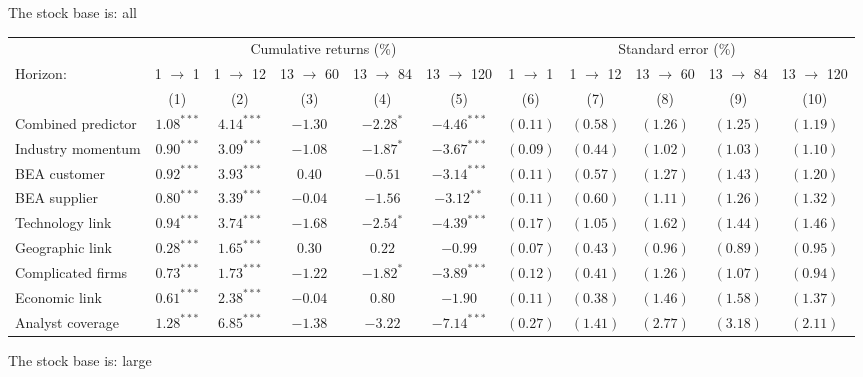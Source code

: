 \documentclass[
]{article}
\author{}
\date{\vspace{-2.5em}}
\begin{document}
The stock base is: all

\begin{tabular}{lcccccccccc}
   \toprule & \multicolumn{5}{c}{Cumulative returns (\%)} & \multicolumn{5}{c}{Standard error (\%)} \\
 \cmidrule(l){2-6} \cmidrule(l){7-11}Horizon: & 1 $\rightarrow$ 1 & 1 $\rightarrow$ 12 & 13 $\rightarrow$ 60 & 13 $\rightarrow$ 84 & 13 $\rightarrow$ 120 & 1 $\rightarrow$ 1 & 1 $\rightarrow$ 12 & 13 $\rightarrow$ 60 & 13 $\rightarrow$ 84 & 13 $\rightarrow$ 120 \\ 
   \cmidrule(l){2-6} \cmidrule(l){7-11} \vspace{5pt} & (1) & (2) & (3) & (4) & (5) & (6) & (7) & (8) & (9) & (10) \\ 
   \vspace{5pt}Combined predictor & $1.08^{***}$ & $4.14^{***}$ & $-1.30$ & $-2.28^{*}$ & $-4.46^{***}$ & $(0.11)$ & $(0.58)$ & $(1.26)$ & $(1.25)$ & $(1.19)$ \\ 
  Industry momentum & $0.90^{***}$ & $3.09^{***}$ & $-1.08$ & $-1.87^{*}$ & $-3.67^{***}$ & $(0.09)$ & $(0.44)$ & $(1.02)$ & $(1.03)$ & $(1.10)$ \\ 
  BEA customer & $0.92^{***}$ & $3.93^{***}$ & $0.40$ & $-0.51$ & $-3.14^{***}$ & $(0.11)$ & $(0.57)$ & $(1.27)$ & $(1.43)$ & $(1.20)$ \\ 
  BEA supplier & $0.80^{***}$ & $3.39^{***}$ & $-0.04$ & $-1.56$ & $-3.12^{**}$ & $(0.11)$ & $(0.60)$ & $(1.11)$ & $(1.26)$ & $(1.32)$ \\ 
  Technology link & $0.94^{***}$ & $3.74^{***}$ & $-1.68$ & $-2.54^{*}$ & $-4.39^{***}$ & $(0.17)$ & $(1.05)$ & $(1.62)$ & $(1.44)$ & $(1.46)$ \\ 
  Geographic link & $0.28^{***}$ & $1.65^{***}$ & $0.30$ & $0.22$ & $-0.99$ & $(0.07)$ & $(0.43)$ & $(0.96)$ & $(0.89)$ & $(0.95)$ \\ 
  Complicated firms & $0.73^{***}$ & $1.73^{***}$ & $-1.22$ & $-1.82^{*}$ & $-3.89^{***}$ & $(0.12)$ & $(0.41)$ & $(1.26)$ & $(1.07)$ & $(0.94)$ \\ 
  Economic link & $0.61^{***}$ & $2.38^{***}$ & $-0.04$ & $0.80$ & $-1.90$ & $(0.11)$ & $(0.38)$ & $(1.46)$ & $(1.58)$ & $(1.37)$ \\ 
  Analyst coverage & $1.28^{***}$ & $6.85^{***}$ & $-1.38$ & $-3.22$ & $-7.14^{***}$ & $(0.27)$ & $(1.41)$ & $(2.77)$ & $(3.18)$ & $(2.11)$ \\ 
   \bottomrule 
\end{tabular}

The stock base is: large
\end{document}

